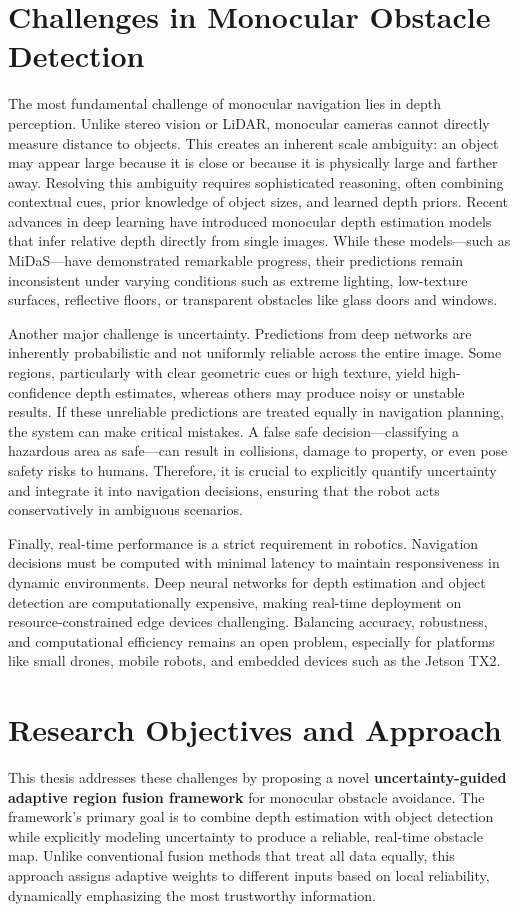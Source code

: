 \documentclass[12pt,oneside]{book}
\begin{document}
\section{Challenges in Monocular Obstacle Detection}
The most fundamental challenge of monocular navigation lies in depth perception. Unlike stereo vision or LiDAR, monocular cameras cannot directly measure distance to objects. This creates an inherent scale ambiguity: an object may appear large because it is close or because it is physically large and farther away. Resolving this ambiguity requires sophisticated reasoning, often combining contextual cues, prior knowledge of object sizes, and learned depth priors. Recent advances in deep learning have introduced monocular depth estimation models that infer relative depth directly from single images. While these models—such as MiDaS—have demonstrated remarkable progress, their predictions remain inconsistent under varying conditions such as extreme lighting, low-texture surfaces, reflective floors, or transparent obstacles like glass doors and windows.

Another major challenge is uncertainty. Predictions from deep networks are inherently probabilistic and not uniformly reliable across the entire image. Some regions, particularly with clear geometric cues or high texture, yield high-confidence depth estimates, whereas others may produce noisy or unstable results. If these unreliable predictions are treated equally in navigation planning, the system can make critical mistakes. A false safe decision—classifying a hazardous area as safe—can result in collisions, damage to property, or even pose safety risks to humans. Therefore, it is crucial to explicitly quantify uncertainty and integrate it into navigation decisions, ensuring that the robot acts conservatively in ambiguous scenarios.

Finally, real-time performance is a strict requirement in robotics. Navigation decisions must be computed with minimal latency to maintain responsiveness in dynamic environments. Deep neural networks for depth estimation and object detection are computationally expensive, making real-time deployment on resource-constrained edge devices challenging. Balancing accuracy, robustness, and computational efficiency remains an open problem, especially for platforms like small drones, mobile robots, and embedded devices such as the Jetson TX2.


\section{Research Objectives and Approach}
This thesis addresses these challenges by proposing a novel \textbf{uncertainty-guided adaptive region fusion framework} for monocular obstacle avoidance. The framework’s primary goal is to combine depth estimation with object detection while explicitly modeling uncertainty to produce a reliable, real-time obstacle map. Unlike conventional fusion methods that treat all data equally, this approach assigns adaptive weights to different inputs based on local reliability, dynamically emphasizing the most trustworthy information.
\end{document}
